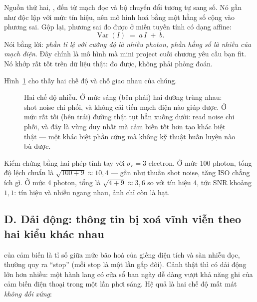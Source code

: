 \documentclass[../../../deep_learning.tex]{subfiles}
\begin{document}
Nguồn thứ hai, , đến từ mạch đọc và bộ chuyển đổi tương tự sang số. Nó gần như độc lập với mức tín hiệu, nên mô hình hoá bằng một hằng số cộng vào phương sai. Gộp lại, phương sai đo được ở miền tuyến tính có dạng affine:
\[
\operatorname{Var}(I) \;=\; a\,I \;+\; b .
\]
Nói bằng lời: \emph{phần tỉ lệ với cường độ là nhiễu photon, phần hằng số là nhiễu của mạch điện}. 
Đây chính là mô hình mà mini project cuối chương yêu cầu bạn fit. Nó khớp rất tốt trên dữ liệu thật: đo được, không phải phỏng đoán.

Hình~\ref{fig:snr-photon} cho thấy hai chế độ và chỗ giao nhau của chúng.

\begin{figure}[H]\centering
{}
\caption{Hai chế độ nhiễu. Ở mức sáng (bên phải) hai đường trùng nhau: shot noise chi phối, và không cải tiến mạch điện nào giúp được. Ở mức rất tối (bên trái) đường thật tụt hẳn xuống dưới: read noise chi phối, và đây là vùng duy nhất mà cảm biến tốt hơn tạo khác biệt thật --- một khác biệt phần cứng mà không kỹ thuật huấn luyện nào bù được.}
\label{fig:snr-photon}
\end{figure}

Kiểm chứng bằng hai phép tính tay với \(\sigma_r = 3\) electron. Ở mức 100 photon, tổng độ lệch chuẩn là \(\sqrt{100+9}\approx 10{,}4\) --- gần như thuần shot noise, tăng ISO chẳng ích gì. Ở mức 4 photon, tổng là \(\sqrt{4+9}\approx 3{,}6\) so với tín hiệu 4, tức SNR khoảng \(1{,}1\): tín hiệu và nhiễu ngang nhau, ảnh chỉ còn là hạt.

\subsection{D. Dải động: thông tin bị xoá vĩnh viễn theo hai kiểu khác nhau}
 của cảm biến là tỉ số giữa mức bão hoà của giếng điện tích và sàn nhiễu đọc, thường quy ra ``stop'' (mỗi stop là một lần gấp đôi). Cảnh thật thì có dải động lớn hơn nhiều: một hành lang có cửa sổ ban ngày dễ dàng vượt khả năng ghi của cảm biến điện thoại trong một lần phơi sáng. Hệ quả là hai chế độ mất mát \emph{không đối xứng}:
\end{document}
